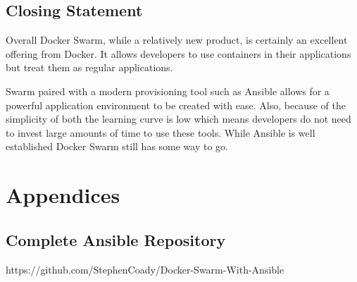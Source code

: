 \documentclass{article}
\begin{document}
\subsection{Closing Statement}
Overall Docker Swarm, while a relatively new product, is certainly an excellent offering from Docker. It allows developers to use containers in their applications but treat them as regular applications.

Swarm paired with a modern provisioning tool such as Ansible allows for a powerful application environment to be created with ease. Also, because of the simplicity of both the learning curve is low which means developers do not need to invest large amounts of time to use these tools. While Ansible is well established Docker Swarm still has some way to go. 



\newpage
\appendix
\section*{Appendices}
\renewcommand{\thesubsection}{\Alph{subsection}}

\subsection{Complete Ansible Repository}
\label{appendix:code}
https://github.com/StephenCoady/Docker-Swarm-With-Ansible


\newpage

\end{document}
